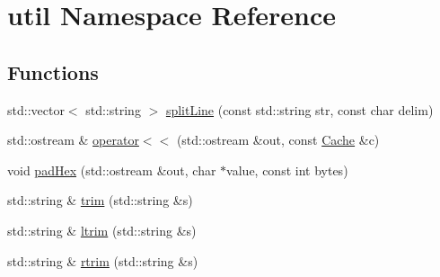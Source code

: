 \hypertarget{namespaceutil}{\section{util Namespace Reference}
\label{namespaceutil}
}
\subsection*{Functions}
\begin{DoxyCompactItemize}
\item 
std\-::vector$<$ std\-::string $>$ \hyperlink{namespaceutil_a34411d644039963b8decc82226313d95}{split\-Line} (const std\-::string str, const char delim)
\item 
std\-::ostream \& \hyperlink{namespaceutil_a9f3fad6b1065c473cb05663852dcb092}{operator$<$$<$} (std\-::ostream \&out, const \hyperlink{class_cache}{Cache} \&c)
\item 
void \hyperlink{namespaceutil_aa3d30aebe03e900320d2ed92112ea872}{pad\-Hex} (std\-::ostream \&out, char $\ast$value, const int bytes)
\item 
std\-::string \& \hyperlink{namespaceutil_a5ff874d18761681bdcd9320fa000acd0}{trim} (std\-::string \&s)
\item 
std\-::string \& \hyperlink{namespaceutil_a9e97757a0970cfb7447c3220823a60e5}{ltrim} (std\-::string \&s)
\item 
std\-::string \& \hyperlink{namespaceutil_a857de838644b097b9c223b58ec618b13}{rtrim} (std\-::string \&s)
\end{DoxyCompactItemize}


